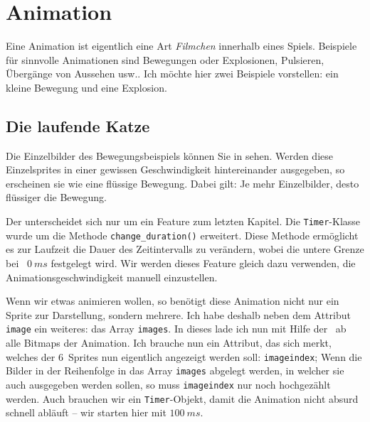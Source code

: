 \section{Animation}
Eine Animation ist eigentlich eine Art \emph{Filmchen} innerhalb eines Spiels. Beispiele für sinnvolle Animationen sind Bewegungen oder Explosionen, Pulsieren, Übergänge von Aussehen usw.. Ich möchte hier zwei Beispiele vorstellen: ein kleine Bewegung und eine Explosion.

\subsection{Die laufende Katze}


Die Einzelbilder des Bewegungsbeispiels können Sie in  sehen. Werden diese Einzelsprites in einer gewissen Geschwindigkeit hintereinander ausgegeben, so erscheinen sie wie eine flüssige Bewegung. Dabei gilt: Je mehr Einzelbilder, desto flüssiger die Bewegung.

Der  unterscheidet sich nur um ein Feature zum letzten Kapitel. Die \texttt{Timer}-Klasse wurde um die Methode \texttt{change\_duration()} erweitert. Diese Methode ermöglicht es zur Laufzeit die Dauer des Zeitintervalls zu verändern, wobei die untere Grenze bei ~$0~ms$ festgelegt wird. Wir werden dieses Feature gleich dazu verwenden, die Animationsgeschwindigkeit manuell einzustellen. 


Wenn wir etwas animieren wollen, so benötigt diese Animation nicht nur ein Sprite zur Darstellung, sondern mehrere. Ich habe deshalb neben dem Attribut \texttt{image} ein weiteres: das Array \texttt{images}. In dieses lade ich nun mit Hilfe der \forSchleife\ ab  alle Bitmaps der Animation. Ich brauche nun ein Attribut, das sich merkt, welches der 6~Sprites nun eigentlich angezeigt werden soll: \texttt{imageindex}; Wenn die Bilder in der Reihenfolge in das Array \texttt{images} abgelegt werden, in welcher sie auch ausgegeben werden sollen, so muss \texttt{imageindex} nur noch hochgezählt werden. Auch brauchen wir ein \texttt{Timer}-Objekt, damit die Animation nicht absurd schnell abläuft -- wir starten hier mit $100~ms$.

